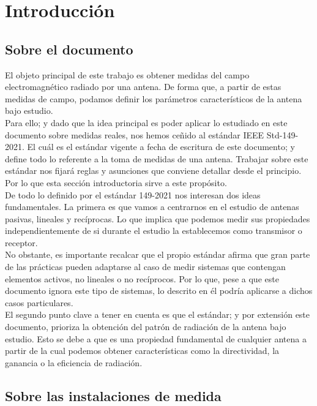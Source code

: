 \documentclass{article}
\begin{document}
\newpage

\section{Introducción }
\subsection{Sobre el documento} 

El objeto principal de este trabajo es obtener medidas del campo electromagnético radiado por una antena. De forma que, a partir de estas medidas de campo, podamos definir los parámetros característicos de la antena bajo estudio.
\\

Para ello; y dado que la idea principal es poder aplicar lo estudiado en este documento sobre medidas reales, nos hemos ceñido al estándar IEEE Std-149-2021. El cuál es el estándar vigente a fecha de escritura de este documento; y define todo lo referente a la toma de medidas de una antena.
Trabajar sobre este estándar nos fijará reglas y asunciones que conviene detallar desde el principio. Por lo que esta sección introductoria sirve a este propósito.
\\

De todo lo definido por el estándar 149-2021 nos interesan dos ideas fundamentales. La primera es que vamos a centrarnos en el estudio de antenas pasivas, lineales y recíprocas. Lo que implica que podemos medir sus propiedades independientemente de si durante el estudio la establecemos como transmisor o receptor.
\\

No obstante, es importante recalcar que el propio estándar afirma que gran parte de las prácticas pueden adaptarse al caso de medir sistemas que contengan elementos activos, no lineales o no recíprocos. Por lo que, pese a que este documento ignora este tipo de sistemas, lo descrito en él podría aplicarse a dichos casos particulares.
\\
El segundo punto clave a tener en cuenta es que el estándar; y por extensión este documento, prioriza la obtención del patrón de radiación de la antena bajo estudio. Esto se debe a que es una propiedad fundamental de cualquier antena a partir de la cual podemos obtener características como la directividad, la ganancia o la eficiencia de radiación.
\\
\newpage
\subsection{Sobre las instalaciones de medida}
\end{document}
